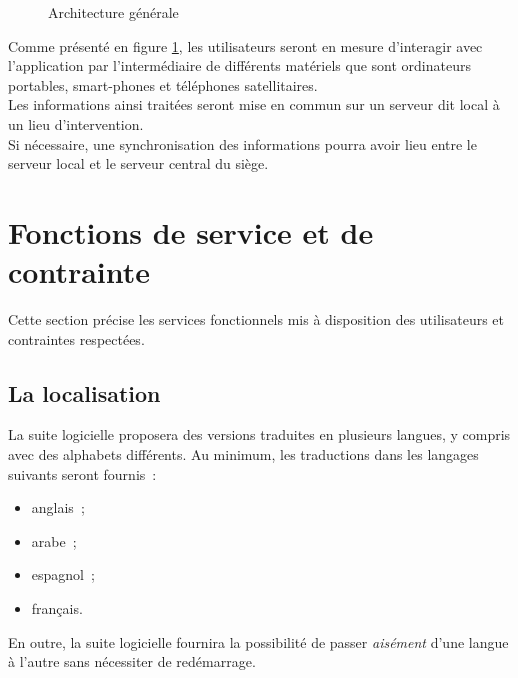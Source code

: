 \begin{figure}[htbp]
	\caption{Architecture générale}
	\label{ArchitecturePhysique}
\end{figure}

Comme présenté en figure \ref{ArchitecturePhysique}, les utilisateurs seront en mesure d'interagir avec l'application par l'intermédiaire de différents matériels que sont ordinateurs portables, smart-phones et téléphones satellitaires.
\\
Les informations ainsi traitées seront mise en commun sur un serveur dit \og local \fg{} à un lieu d'intervention.
\\
Si nécessaire, une synchronisation des informations pourra avoir lieu entre le serveur \og local \fg{} et le serveur \og central \fg{} du siège.

\section{Fonctions de service et de contrainte}
Cette section précise les services fonctionnels mis à disposition des utilisateurs et contraintes respectées.

\subsection{La localisation}
La suite logicielle proposera des versions traduites en plusieurs langues, y compris avec des alphabets différents. Au minimum, les traductions dans les langages suivants seront fournis~:
\begin{itemize}
	\item anglais~;
	\item arabe~;
	\item espagnol~;
	\item français.
\end{itemize}
En outre, la suite logicielle fournira la possibilité de passer \emph{aisément} d'une langue à l'autre sans nécessiter de redémarrage.

